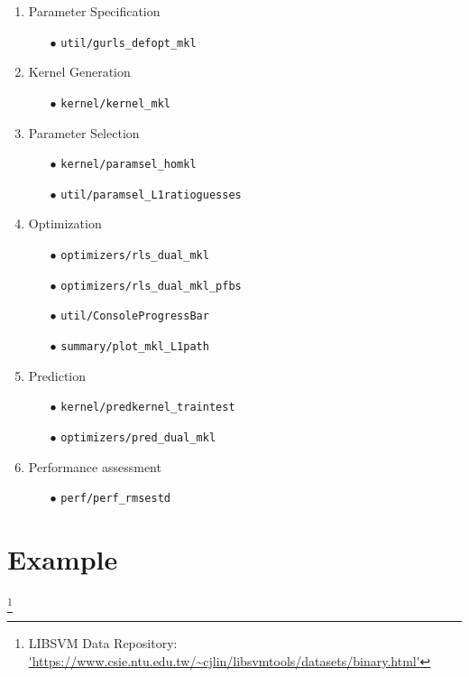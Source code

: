 \documentclass[tablecaption=bottom,wcp]{jmlr} %
\begin{document}
\begin{enumerate}
\item Parameter Specification
\begin{enumerate}
\item [$\bullet$] {\tt util/gurls\_defopt\_mkl}
\end{enumerate}
\item Kernel Generation
\begin{enumerate}
\item [$\bullet$] {\tt kernel/kernel\_mkl}
\end{enumerate}
\item Parameter Selection
\begin{enumerate}
\item [$\bullet$] {\tt kernel/paramsel\_homkl}
\item [$\bullet$] {\tt util/paramsel\_L1ratioguesses}
\end{enumerate}
\item Optimization
\begin{enumerate}
\item [$\bullet$] {\tt optimizers/rls\_dual\_mkl}
\item [$\bullet$] {\tt optimizers/rls\_dual\_mkl\_pfbs}
\item [$\bullet$] {\tt util/ConsoleProgressBar}
\item [$\bullet$] {\tt summary/plot\_mkl\_L1path}
\end{enumerate}
\item Prediction
\begin{enumerate}
\item [$\bullet$] {\tt kernel/predkernel\_traintest}
\item [$\bullet$] {\tt optimizers/pred\_dual\_mkl}
\end{enumerate}
\item Performance assessment
\begin{enumerate}
\item [$\bullet$] {\tt perf/perf\_rmsestd}
\end{enumerate}
\end{enumerate}

\section{Example}

\footnote{LIBSVM Data Repository:
\url{'https://www.csie.ntu.edu.tw/~cjlin/libsvmtools/datasets/binary.html'}}

\newpage

\end{document}
